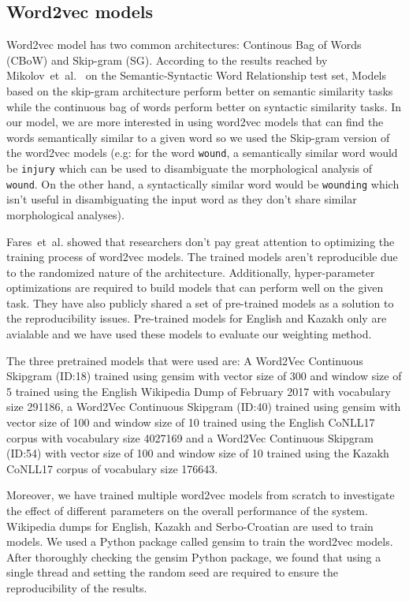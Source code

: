 \documentclass[free]{flammie}
\begin{document}
\subsection{Word2vec models}
Word2vec model has two common architectures: Continous Bag of Words (CBoW) and
Skip-gram (SG). According to the results reached by
Mikolov~et~al.~\cite{mikolov2013efficient} on the Semantic-Syntactic Word
Relationship test set, Models based on the skip-gram architecture perform better
on semantic similarity tasks while the continuous bag of words perform better on
syntactic similarity tasks. In our model, we are more interested in using
word2vec models that can find the words semantically similar to a given word so
we used the Skip-gram version of the word2vec models (e.g: for the word
\texttt{wound}, a semantically similar word would be \texttt{injury} which can
be used to disambiguate the morphological analysis of \texttt{wound}. On the
other hand, a syntactically similar word would be \texttt{wounding} which isn't
useful in disambiguating the input word as they don't share similar
morphological analyses).

Fares~et~al. \cite{Velldal2017word} showed that researchers don't pay great
attention to optimizing the training process of word2vec models. The trained
models aren't reproducible due to the randomized nature of the architecture.
Additionally, hyper-parameter optimizations are required to build models that
can perform well on the given task.
They have also publicly shared a set of pre-trained models as a solution to the
reproducibility issues. Pre-trained models for English and Kazakh only are
avialable and we have used these models to evaluate our weighting method.

The three pretrained models that were used are: A Word2Vec Continuous Skipgram
(ID:18) trained using gensim with vector size of 300 and window size of 5
trained using the English Wikipedia Dump of February 2017 with vocabulary
size 291186, a Word2Vec Continuous Skipgram (ID:40) trained using gensim
with vector size of 100 and window size of 10 trained using the English
CoNLL17 corpus with vocabulary size 4027169 and a Word2Vec Continuous
Skipgram (ID:54) with vector size of 100	and window size of 10 trained
using the Kazakh CoNLL17 corpus of vocabulary size 176643.

Moreover, we have trained multiple word2vec models from scratch to investigate
the effect of different parameters on the overall performance of the system.
Wikipedia dumps for English, Kazakh and Serbo-Croatian are used to train
models. We used a Python package called gensim to train the word2vec models.
After thoroughly checking the gensim Python package, we found that using a
single thread and setting the random seed are required to ensure the
reproducibility of the results.
\end{document}
